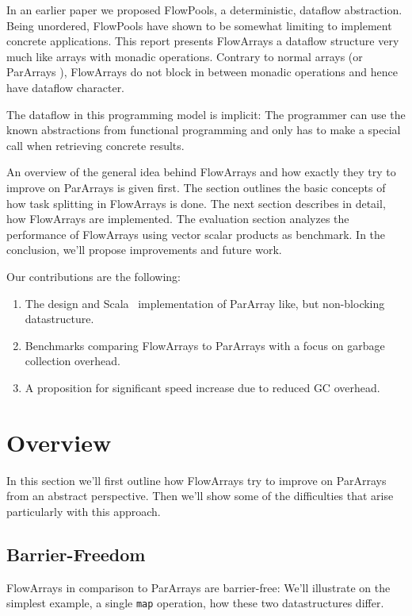 \documentclass[runningheads,a4paper,fleqn]{llncs}
\begin{document}
In an earlier paper \cite{FP12} we proposed FlowPools, a
deterministic, dataflow abstraction. Being unordered, FlowPools have
shown to be somewhat limiting to implement concrete applications. This
report presents FlowArrays a dataflow structure very much like arrays
with monadic operations. Contrary to normal arrays (or ParArrays
\cite{collect11}), FlowArrays do not block in between monadic
operations and hence have dataflow character.

The dataflow in this programming model is implicit: The programmer can
use the known abstractions from functional programming and only has to
make a special call when retrieving concrete results.

An overview of the general idea behind FlowArrays and how exactly they
try to improve on ParArrays is given first. The section outlines the
basic concepts of how task splitting in FlowArrays is done. The next
section describes in detail, how FlowArrays are implemented. The
evaluation section analyzes the performance of FlowArrays using vector
scalar products as benchmark. In the conclusion, we'll propose
improvements and future work.

Our contributions are the following:
\begin{enumerate}
\item The design and Scala~\cite{Odersky10} implementation of ParArray
  like, but non-blocking datastructure.
\item Benchmarks comparing FlowArrays to ParArrays with a focus on
  garbage collection overhead.
\item A proposition for significant speed increase due to reduced GC
  overhead.
\end{enumerate}

\section{Overview}
\label{sec:overview}

In this section we'll first outline how FlowArrays try to improve on
ParArrays from an abstract perspective. Then we'll show some of the
difficulties that arise particularly with this approach.

\subsection{Barrier-Freedom}
FlowArrays in comparison to ParArrays are barrier-free: We'll
illustrate on the simplest example, a single \texttt{map}
operation, how these two datastructures differ.
\end{document}

